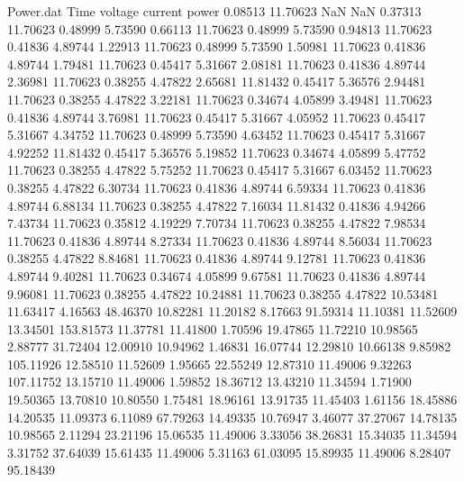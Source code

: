 \begin{filecontents}{Power.dat}
Time voltage current power
   0.08513   11.70623        NaN        NaN
   0.37313   11.70623    0.48999    5.73590
   0.66113   11.70623    0.48999    5.73590
   0.94813   11.70623    0.41836    4.89744
   1.22913   11.70623    0.48999    5.73590
   1.50981   11.70623    0.41836    4.89744
   1.79481   11.70623    0.45417    5.31667
   2.08181   11.70623    0.41836    4.89744
   2.36981   11.70623    0.38255    4.47822
   2.65681   11.81432    0.45417    5.36576
   2.94481   11.70623    0.38255    4.47822
   3.22181   11.70623    0.34674    4.05899
   3.49481   11.70623    0.41836    4.89744
   3.76981   11.70623    0.45417    5.31667
   4.05952   11.70623    0.45417    5.31667
   4.34752   11.70623    0.48999    5.73590
   4.63452   11.70623    0.45417    5.31667
   4.92252   11.81432    0.45417    5.36576
   5.19852   11.70623    0.34674    4.05899
   5.47752   11.70623    0.38255    4.47822
   5.75252   11.70623    0.45417    5.31667
   6.03452   11.70623    0.38255    4.47822
   6.30734   11.70623    0.41836    4.89744
   6.59334   11.70623    0.41836    4.89744
   6.88134   11.70623    0.38255    4.47822
   7.16034   11.81432    0.41836    4.94266
   7.43734   11.70623    0.35812    4.19229
   7.70734   11.70623    0.38255    4.47822
   7.98534   11.70623    0.41836    4.89744
   8.27334   11.70623    0.41836    4.89744
   8.56034   11.70623    0.38255    4.47822
   8.84681   11.70623    0.41836    4.89744
   9.12781   11.70623    0.41836    4.89744
   9.40281   11.70623    0.34674    4.05899
   9.67581   11.70623    0.41836    4.89744
   9.96081   11.70623    0.38255    4.47822
  10.24881   11.70623    0.38255    4.47822
  10.53481   11.63417    4.16563   48.46370
  10.82281   11.20182    8.17663   91.59314
  11.10381   11.52609   13.34501  153.81573
  11.37781   11.41800    1.70596   19.47865
  11.72210   10.98565    2.88777   31.72404
  12.00910   10.94962    1.46831   16.07744
  12.29810   10.66138    9.85982  105.11926
  12.58510   11.52609    1.95665   22.55249
  12.87310   11.49006    9.32263  107.11752
  13.15710   11.49006    1.59852   18.36712
  13.43210   11.34594    1.71900   19.50365
  13.70810   10.80550    1.75481   18.96161
  13.91735   11.45403    1.61156   18.45886
  14.20535   11.09373    6.11089   67.79263
  14.49335   10.76947    3.46077   37.27067
  14.78135   10.98565    2.11294   23.21196
  15.06535   11.49006    3.33056   38.26831
  15.34035   11.34594    3.31752   37.64039
  15.61435   11.49006    5.31163   61.03095
  15.89935   11.49006    8.28407   95.18439

\end{filecontents}

